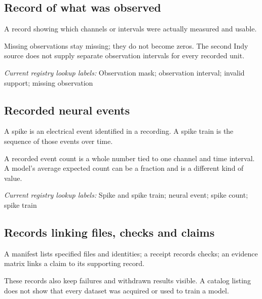 \begin{samepage}
\subsection*{Record of what was observed}
\noindent A record showing which channels or intervals were actually measured and usable.\par
\end{samepage}
\begin{samepage}
\noindent Missing observations stay missing; they do not become zeros. The second Indy source does not supply separate observation intervals for every recorded unit.\par\nopagebreak[4]

\end{samepage}


\noindent\textit{Current registry lookup labels:} Observation mask; observation interval; invalid support; missing observation\par

\begin{samepage}
\subsection*{Recorded neural events}
\noindent A spike is an electrical event identified in a recording. A spike train is the sequence of those events over time.\par
\end{samepage}
\begin{samepage}
\noindent A recorded event count is a whole number tied to one channel and time interval. A model’s average expected count can be a fraction and is a different kind of value.\par\nopagebreak[4]

\end{samepage}


\noindent\textit{Current registry lookup labels:} Spike and spike train; neural event; spike count; spike train\par

\begin{samepage}
\subsection*{Records linking files, checks and claims}
\noindent A manifest lists specified files and identities; a receipt records checks; an evidence matrix links a claim to its supporting record.\par
\end{samepage}
\begin{samepage}
\noindent These records also keep failures and withdrawn results visible. A catalog listing does not show that every dataset was acquired or used to train a model.\par\nopagebreak[4]

\end{samepage}


